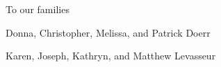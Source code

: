 \documentclass[twoside,10pt,]{book}
\numberwithin{equation}{section}
\begin{document}
\cleardoublepage
\thispagestyle{empty}
\begin{center}\Large%
To our families%
\end{center}
\begin{center}\Large%
Donna, Christopher, Melissa, and Patrick Doerr%
\end{center}
\begin{center}\Large%
Karen, Joseph, Kathryn, and Matthew Levasseur%
\end{center}
\clearpage
\thispagestyle{empty}
\null%
\clearpage
%
%
\typeout{************************************************}
\typeout{************************************************}
%
\end{document}
